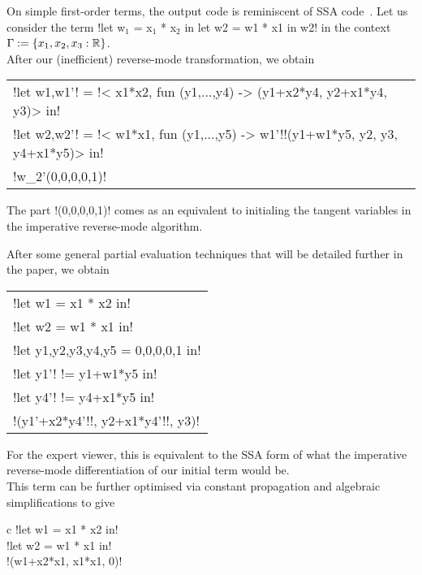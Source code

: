 \begin{example}
On simple first-order terms, the output code is reminiscent of SSA code~\cite{cytron1989efficient}.
Let us consider the term !let w$_1$ = x$_1$ * x$_2$ in let w2 = w1 * x1 in w2! in the context $\Gamma:=\{x_1,x_2, x_3:\mathbb{R}\}$.\\
After our (inefficient) reverse-mode transformation, we obtain
\begin{center}
    \begin{tabular}{l}
        !let w1,w1'! = !< x1*x2, fun (y1,...,y4) -> (y1+x2*y4, y2+x1*y4, y3)> in!\\
        !let w2,w2'! = !< w1*x1, fun (y1,...,y5) -> w1'!!(y1+w1*y5, y2, y3, y4+x1*y5)> in!\\
        !w_2'(0,0,0,0,1)!
    \end{tabular}
\end{center}
The part !(0,0,0,0,1)! comes as an equivalent to initialing the tangent variables in the imperative reverse-mode algorithm. 

After some general partial evaluation techniques that will be detailed further in the paper, we obtain     

    \begin{center}
            \begin{tabular}{l}
                !let w1 = x1 * x2 in!\\ 
                !let w2 = w1 * x1 in!\\
                !let y1,y2,y3,y4,y5 = 0,0,0,0,1 in!\\
                !let y1'! != y1+w1*y5 in!\\
                !let y4'! != y4+x1*y5 in!\\
                !(y1'+x2*y4'!!, y2+x1*y4'!!, y3)!
            \end{tabular}
    \end{center}   
For the expert viewer, this is equivalent to the SSA form \cite{cytron1989efficient} of what the imperative reverse-mode differentiation of our initial term would be.\\
This term can be further optimised via constant propagation and algebraic simplifications to give
        \begin{center}
            \begin{tabular}{{c}}
                !let w1 = x1 * x2 in!\\ 
                !let w2 = w1 * x1 in!\\
                !(w1+x2*x1, x1*x1, 0)!
            \end{tabular}
        \end{center}
    \end{example}

